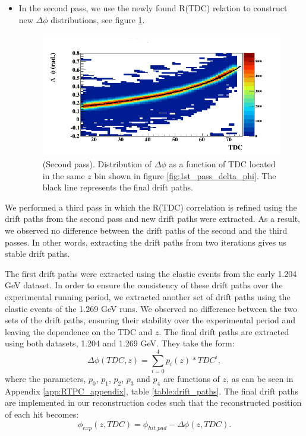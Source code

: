 \begin{itemize}
\item In the second pass, we use the newly found R(TDC) relation to construct new $\Delta \phi$ distributions, see figure \ref{fig:final_drift_paths}.

\begin{figure}[tp]
\centering
\includegraphics[scale=0.45]{fig_rtpc/FitResult_p2_10.png}
\caption{(Second pass). Distribution of $\Delta \phi$ as a function of TDC 
located in the same $z$ bin shown in figure \ref{fig:1st_pass_delta_phi}. The 
black line represents the final drift paths.}
\label{fig:final_drift_paths}
\end{figure}
\end{itemize}

We performed a third pass in which the R(TDC) correlation is refined using the 
drift paths from the second pass and new drift paths were extracted. As a 
result, we observed no difference between the drift paths of the second and the 
third passes. In other words, extracting the drift paths from two iterations 
gives us stable drift paths. 
 
The first drift paths were extracted using the elastic events from the early 
1.204 GeV dataset. In order to ensure the consistency of these drift paths over 
the experimental running period, we extracted another set of drift paths using 
the elastic events of the 1.269 GeV runs. We observed no difference between the 
two sets of the drift paths, ensuring their stability over the experimental 
period and leaving the dependence on the TDC and $z$. The final drift paths are 
extracted using both datasets, 1.204 and 1.269 GeV. They take the form:
\vspace{-0.1in}
\begin{equation}
\Delta \phi (TDC, z)=  \sum\limits_{i=0}^{4} p_{i}(z)*TDC^{i},
\end{equation}
where the parameters, $p_{0}$, $p_{1}$, $p_{2}$, $p_{3}$ and $p_{4}$ are 
functions of $z$, as can be seen in Appendix \ref{app:RTPC_appendix}, table 
\ref{table:drift_paths}. The final drift paths are implemented in our 
reconstruction codes such that the reconstructed position of each hit becomes:
\begin{equation}
\phi_{exp}(z, TDC) = \phi _{hit\_pad} - \Delta \phi (z, TDC).
\end{equation} 

